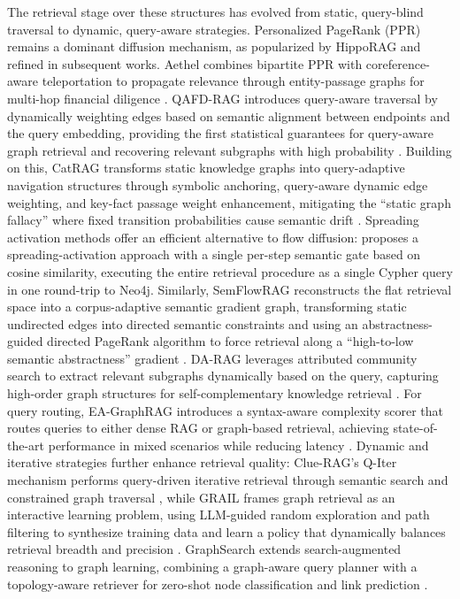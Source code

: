 \documentclass[11pt]{article}
\begin{document}
The retrieval stage over these structures has evolved from static, query-blind traversal to dynamic, query-aware strategies. Personalized PageRank (PPR) remains a dominant diffusion mechanism, as popularized by HippoRAG and refined in subsequent works. Aethel combines bipartite PPR with coreference-aware teleportation to propagate relevance through entity-passage graphs for multi-hop financial diligence \cite{ref296}. QAFD-RAG introduces query-aware traversal by dynamically weighting edges based on semantic alignment between endpoints and the query embedding, providing the first statistical guarantees for query-aware graph retrieval and recovering relevant subgraphs with high probability \cite{ref44}. Building on this, CatRAG transforms static knowledge graphs into query-adaptive navigation structures through symbolic anchoring, query-aware dynamic edge weighting, and key-fact passage weight enhancement, mitigating the ``static graph fallacy'' where fixed transition probabilities cause semantic drift \cite{ref297}. Spreading activation methods offer an efficient alternative to flow diffusion: \cite{ref298} proposes a spreading-activation approach with a single per-step semantic gate based on cosine similarity, executing the entire retrieval procedure as a single Cypher query in one round-trip to Neo4j. Similarly, SemFlowRAG reconstructs the flat retrieval space into a corpus-adaptive semantic gradient graph, transforming static undirected edges into directed semantic constraints and using an abstractness-guided directed PageRank algorithm to force retrieval along a ``high-to-low semantic abstractness'' gradient \cite{ref299}. DA-RAG leverages attributed community search to extract relevant subgraphs dynamically based on the query, capturing high-order graph structures for self-complementary knowledge retrieval \cite{ref39}. For query routing, EA-GraphRAG introduces a syntax-aware complexity scorer that routes queries to either dense RAG or graph-based retrieval, achieving state-of-the-art performance in mixed scenarios while reducing latency \cite{ref300}. Dynamic and iterative strategies further enhance retrieval quality: Clue-RAG's Q-Iter mechanism performs query-driven iterative retrieval through semantic search and constrained graph traversal \cite{ref287}, while GRAIL frames graph retrieval as an interactive learning problem, using LLM-guided random exploration and path filtering to synthesize training data and learn a policy that dynamically balances retrieval breadth and precision \cite{ref301}. GraphSearch extends search-augmented reasoning to graph learning, combining a graph-aware query planner with a topology-aware retriever for zero-shot node classification and link prediction \cite{ref302}.
\end{document}
